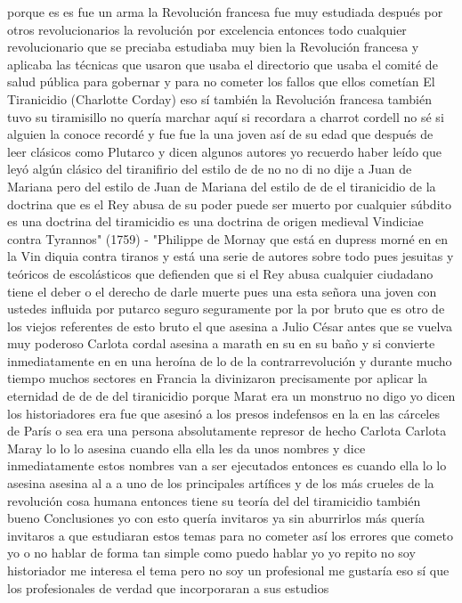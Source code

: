 porque es es fue un arma la Revolución francesa fue muy estudiada después por otros revolucionarios la revolución por excelencia
entonces todo cualquier revolucionario que se preciaba estudiaba muy bien la Revolución francesa y aplicaba las técnicas que usaron que usaba el directorio
que usaba el comité de salud pública para gobernar y para no cometer los fallos que ellos cometían
El Tiranicidio (Charlotte Corday)
eso sí también la Revolución francesa también tuvo su tiramisillo no quería marchar aquí si recordara a charrot cordell no sé si alguien la conoce
recordé y fue fue la una joven así de su edad que después de leer clásicos como Plutarco
y dicen algunos autores yo recuerdo haber leído que leyó algún clásico del tiranifirio del estilo de de no no di no dije a Juan de Mariana
pero del estilo de Juan de Mariana del estilo de de el tiranicidio de la doctrina que es el Rey
abusa de su poder puede ser muerto por cualquier súbdito es una doctrina del tiramicidio es una doctrina de origen medieval
Vindiciae contra Tyrannos" (1759) - "Philippe de Mornay
que está en dupress morné en en la Vin diquia contra tiranos y está una serie de autores sobre todo pues jesuitas y teóricos de escolásticos
que defienden que si el Rey abusa cualquier ciudadano tiene el deber o el derecho de darle muerte
pues una esta señora una joven con ustedes influida por putarco seguro seguramente por la por bruto
que es otro de los viejos referentes de esto bruto el que asesina a Julio César antes que se vuelva muy poderoso
Carlota cordal asesina a marath en su en su baño
y si convierte inmediatamente en en una heroína de lo de la contrarrevolución y durante mucho tiempo muchos sectores en Francia la divinizaron
precisamente por aplicar la eternidad de de de del tiranicidio porque Marat era un monstruo
no digo yo dicen los historiadores era fue que asesinó a los presos indefensos en la en las cárceles de París
o sea era una persona absolutamente represor de hecho Carlota Carlota Maray lo lo
lo asesina cuando ella ella les da unos nombres y dice inmediatamente estos nombres van a ser ejecutados entonces es cuando ella lo
lo asesina asesina al a a uno de los principales artífices y de los más crueles de la revolución
cosa humana entonces tiene su teoría del del tiramicidio también bueno
Conclusiones
yo con esto quería invitaros ya sin aburrirlos más quería invitaros a que estudiaran estos temas para no cometer así los errores que cometo yo
o no hablar de forma tan simple como puedo hablar yo yo repito no soy historiador me interesa el tema
pero no soy un profesional me gustaría eso sí que los profesionales de verdad que incorporaran a sus estudios
